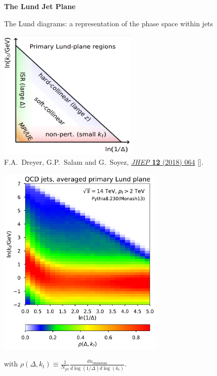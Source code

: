 \documentclass[9pt,a4paper,unknownkeysallowed,xcolor=dvipsnames,aspectratio=43]{beamer}
\begin{document}
\begin{frame}{\bf \huge The Lund Jet Plane}
\vspace{2mm}

The Lund diagrams: a representation of the phase space within jets
\vspace{2mm}
\begin{center}
\includegraphics[width=0.5\textwidth]{05/lund.png}\\\vspace{2mm}
{\tiny \color{teablue}F.A.~Dreyer, G.P.~Salam and G.~Soyez, %
  \href{https://doi.org/10.1007/JHEP12(2018)064}{\emph{JHEP} {\bfseries 12}
  (2018) 064} [\href{https://arxiv.org/abs/1807.04758}{{}}].
}
\end{center}

\end{frame}
%
%
\begin{frame}
\vspace{2mm}
\begin{center}
\includegraphics[width=0.6\textwidth]{05/qcdjet.pdf}
\end{center}
with $
\rho(\Delta,k_t) \equiv \frac{1}{N_\text{jet}}\frac{dn_\text{emissions}}{d\log(1/\Delta)d\log(k_t)}
$.

\end{frame}
\end{document}
